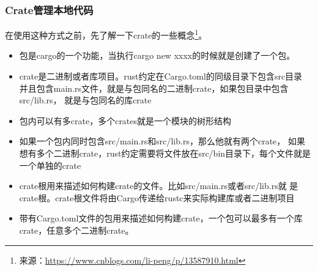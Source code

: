 \subsubsection{Crate管理本地代码}
在使用这种方式之前，先了解一下crate的一些概念\footnote{来源：\url{https://www.cnblogs.com/li-peng/p/13587910.html}}。
\begin{itemize}
  \item 包是cargo的一个功能，当执行cargo new xxxx的时候就是创建了一个包。
  \item crate是二进制或者库项目。rust约定在Cargo.toml的同级目录下包含src目录
并且包含main.rs文件，就是与包同名的二进制crate，如果包目录中包含src/lib.rs，
就是与包同名的库crate
  \item 包内可以有多crate，多个crates就是一个模块的树形结构
  \item 如果一个包内同时包含src/main.rs和src/lib.rs，那么他就有两个crate，
如果想有多个二进制crate，rust约定需要将文件放在src/bin目录下，每个文件就是
一个单独的crate
  \item crate根用来描述如何构建crate的文件。比如src/main.rs或者src/lib.rs就
是crate根。crate根文件将由Cargo传递给rustc来实际构建库或者二进制项目
  \item 带有Cargo.toml文件的包用来描述如何构建crate，一个包可以最多有一个库
crate，任意多个二进制crate。
\end{itemize}

